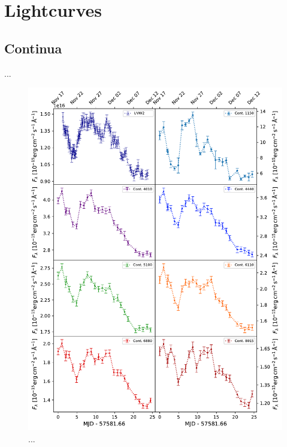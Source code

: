 \section{Lightcurves}




\subsection{Continua}
...
\begin{figure}[!ht]
	\centering
	\includegraphics[width=\textwidth]{pictures/Chapter4/lightcurves/NGC4593_Continua.pdf}
	\caption{...}
	\label{fig:continua_lightcurves}
\end{figure}

